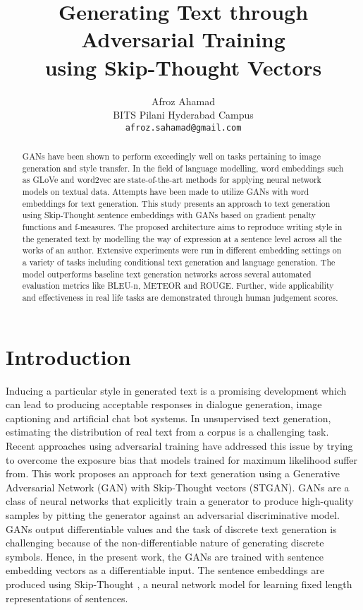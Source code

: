 \documentclass[11pt,a4paper]{article}
\title{Generating Text through Adversarial Training\\
        using Skip-Thought Vectors}
\author{Afroz Ahamad \\
  BITS Pilani Hyderabad Campus \\
  {\tt afroz.sahamad@gmail.com} 
  }
\date{}
\begin{document}
\maketitle
\begin{abstract}
GANs have been shown to perform exceedingly well on tasks pertaining to image generation and style transfer. In the field of language modelling, word embeddings such as GLoVe and word2vec are state-of-the-art methods for applying neural network models on textual data. Attempts have been made to utilize GANs with word embeddings for text generation. This study presents an approach to text generation using Skip-Thought sentence embeddings with GANs based on gradient penalty functions and f-measures. The proposed architecture aims to reproduce writing style in the generated text by 
modelling the way of expression at a sentence level across all the works of an author. 
Extensive experiments were run in different embedding settings on a variety of tasks including conditional text generation and language generation. The model outperforms baseline text generation networks across several automated evaluation metrics like BLEU-n, METEOR and ROUGE. Further, wide applicability and effectiveness in real life tasks are demonstrated through human judgement scores.

\end{abstract}

\section{Introduction}

Inducing a particular style in generated text is a promising development which can lead to producing acceptable responses in dialogue generation, image captioning and artificial chat bot systems. In unsupervised text generation, estimating the distribution of real text from a corpus is a challenging task. Recent approaches using adversarial training have addressed this issue by trying to overcome the exposure bias that models trained for maximum likelihood suffer from.  This work proposes an approach for text generation using a Generative Adversarial Network (GAN) with Skip-Thought vectors (STGAN). GANs \cite{GAN} are a class of neural networks that explicitly train a generator to produce high-quality samples by pitting the generator against an adversarial discriminative model. GANs output differentiable values and the task of discrete text generation is challenging because of the non-differentiable nature of generating discrete symbols. Hence, in the present work, the GANs are trained with sentence embedding vectors as a differentiable input. The sentence embeddings are produced using Skip-Thought \cite{kiros2015skip}, a neural network model for learning fixed length representations of sentences.
\end{document}
